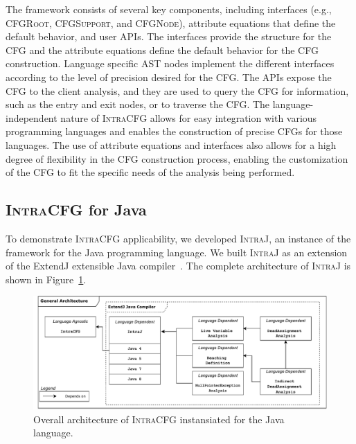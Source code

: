 The framework consists of several key components, including interfaces
(e.g., \textsc{CFGRoot}, \textsc{CFGSupport}, and \textsc{CFGNode}), attribute equations that define the
default behavior, and user APIs. The interfaces provide the structure for the
CFG and the attribute equations define the default behavior for the CFG
construction. Language specific AST nodes implement the different interfaces 
according to the level of precision desired for the CFG.
The APIs expose the CFG to the client analysis, and they are used to query the CFG
for information, such as the entry and exit nodes, or to traverse the CFG.
The language-independent nature of \textsc{IntraCFG} allows for easy integration 
with various programming languages and enables the construction of precise CFGs 
for those languages. The use of attribute equations and interfaces also allows 
for a high degree of flexibility in the CFG construction process, 
enabling the customization of the CFG to fit the specific needs of the 
analysis being performed.






\subsection{\textsc{IntraCFG} for Java}
To demonstrate \textsc{IntraCFG} applicability, we developed
\textsc{IntraJ}, an instance of the framework for the Java programming language.
We built \textsc{IntraJ} as an extension of the ExtendJ extensible Java compiler~\cite{DBLP:conf/oopsla/EkmanH07}.
The complete architecture of \textsc{IntraJ} is shown in Figure~\ref{fig:intraJ}.
\begin{figure}[H]
    \centering
    \includegraphics[scale=0.52]{kappa/img/architecturejava.pdf}
    \caption{\label{fig:intraJ} Overall architecture of \textsc{IntraCFG} instansiated for the Java language.}
\end{figure}

